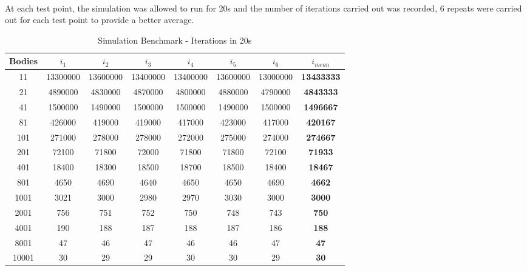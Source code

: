 \paragraph{}
At each test point, the simulation was allowed to run for 20s and the number of iterations carried out was recorded, 6 repeats were carried out for each test point to provide a better average.\\

\begin{table}[h]
\footnotesize
\centering
\caption{Simulation Benchmark - Iterations in 20s}
\def\arraystretch{1.5}
\begin{tabular}{|c|c|c|c|c|c|c|c|} \hline
Bodies & $i_1$ & $i_2$ & $i_3$ & $i_4$ & $i_5$ & $i_6$ & $i_{mean}$\\ \hline
    11 & 13300000 & 13600000 & 13400000 & 13400000 & 13600000 & 13000000 & \textbf{13433333} \\ \hline
    21 &	4890000	&  4830000 &	4870000 &  4800000 &	4880000 &	 4790000 &	\textbf{4843333} \\ \hline
    41 &	1500000	&  1490000 &	1500000 &  1500000 &	1490000 &  1500000 &  \textbf{1496667} \\ \hline
    81 &   426000 &   419000 &   419000 &   417000 &   423000 &   417000 &   \textbf{420167} \\ \hline
   101 &   271000 &   278000 &   278000 &   272000 &   275000 &   274000 &   \textbf{274667} \\ \hline
   201 &    72100 &    71800 &    72000 &    71800 &    71800 &    72100 &    \textbf{71933} \\ \hline
   401 &    18400 &    18300 &    18500	&    18700 &    18500 &    18400 &    \textbf{18467} \\ \hline
   801 &     4650	&     4690 &     4640 &   	4650 &     4650 &    	4690 &     \textbf{4662} \\ \hline
  1001 &     3021	&     3000 &     2980 &   	2970 &     3030 &   	3000 &     \textbf{3000} \\ \hline
  2001 &      756	&      751 &	    752 &	     750 &	    748 &	     743 &      \textbf{750} \\ \hline
  4001 &      190 &	     188 &	    187 &      188 &	    187 &    	 186 &      \textbf{188} \\ \hline
  8001 &       47 &	      46 &       47 &	      46 &       46 &	      47 &       \textbf{47} \\ \hline
 10001 &       30 &	      29 &       29 &	      30 &       30 &	      29 &       \textbf{30} \\ \hline
\end{tabular}
\end{table}

